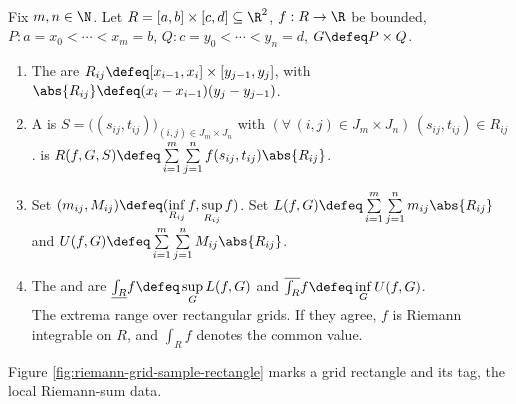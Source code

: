 \begin{definition} \label{def:rectangular-grid-riemann-sum} \\
Fix $m,n\in\N$. Let $R=[a,b]\times[c,d]\subseteq\R^2$, $f:R\to\R$ be bounded,  $P:a=x_0<\cdots<x_m=b$, $Q:c=y_0<\cdots<y_n=d$, $G\defeq P\times Q$.
\begin{enumerate}[label=(\roman*)]
\setlength{\itemsep}{0pt}
\item The  are $R_{ij}\defeq[x_{i-1},x_i]\times[y_{j-1},y_j]$, with $\abs{R_{ij}}\defeq(x_i-x_{i-1})(y_j-y_{j-1})$.
\item A  is $S=\bigl((s_{ij},t_{ij})\bigr)_{(i,j)\in J_m\times J_n}$ with $(\forall\,(i,j)\in J_m\times J_n)\,(s_{ij},t_{ij})\in R_{ij}$.  is $R(f,G,S)\defeq\sum\limits_{i=1}^{m}\sum\limits_{j=1}^{n}f(s_{ij},t_{ij})\abs{R_{ij}}$.
\item Set $(m_{ij},M_{ij})\defeq(\inf\limits_{R_{ij}}f,\sup\limits_{R_{ij}}f)$. Set $L(f,G)\defeq\sum\limits_{i=1}^{m}\sum\limits_{j=1}^{n}m_{ij}\abs{R_{ij}}$ and $U(f,G)\defeq\sum\limits_{i=1}^{m}\sum\limits_{j=1}^{n}M_{ij}\abs{R_{ij}}$.
\item The  and  are $\underline{\int_R}f\defeq\sup\limits_G L(f,G)$ and $\overline{\int_R}f\defeq\inf\limits_G U(f,G)$.\\
The extrema range over rectangular grids. If they agree, $f$ is Riemann integrable on $R$, and $\int_R f$ denotes the common value.
\end{enumerate}
\end{definition}

Figure \ref{fig:riemann-grid-sample-rectangle} marks a grid rectangle and its tag, the local Riemann-sum data.

\begin{illustrationfigure}[H]
  \centering
  
  \caption{A grid rectangle $R_{ij}$ and sample point $(s_{ij},t_{ij})$.}
  \label{fig:riemann-grid-sample-rectangle}
\end{illustrationfigure}


